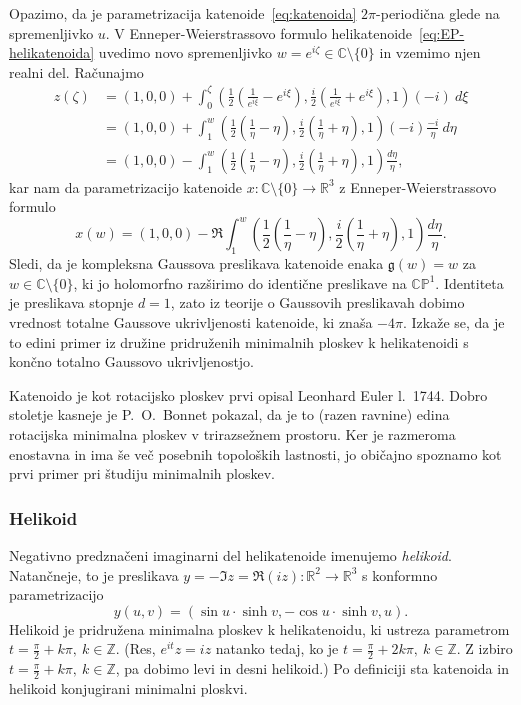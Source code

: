 \documentclass[12pt,a4paper,twoside]{article}
\theoremstyle{definition} %
\theoremstyle{plain} %
\numberwithin{equation}{section}  %
\begin{document}
Opazimo, da je parametrizacija katenoide~\eqref{eq:katenoida} $2 \pi$-periodična glede na spremenljivko $u$. V Enneper-Weierstrassovo formulo helikatenoide~\eqref{eq:EP-helikatenoida} uvedimo novo spremenljivko $w = e^{i \zeta} \in \mathbb{C} \setminus \{0\}$ in vzemimo njen realni del. Računajmo
\begin{align*}
z(\zeta) &= (1,0,0) + \int_{0}^{\zeta} \left( \frac{1}{2} \left(\frac{1}{e^{i\xi}} - e^{i\xi} \right), \frac{i}{2} \left(\frac{1}{e^{i\xi}} + e^{i\xi} \right), 1 \right) (-i) \ d\xi \\
	&= (1,0,0) + \int_{1}^{w} \left( \frac{1}{2} \left(\frac{1}{\eta} - \eta \right), \frac{i}{2} \left(\frac{1}{\eta} + \eta \right), 1 \right) (-i) \frac{-i}{\eta} \ d\eta \\
	&= (1,0,0) - \int_{1}^{w} \left( \frac{1}{2} \left(\frac{1}{\eta} - \eta \right), \frac{i}{2} \left(\frac{1}{\eta} + \eta \right), 1 \right) \frac{d\eta}{\eta},
\end{align*}
kar nam da parametrizacijo katenoide $x \colon \mathbb{C} \setminus \{0\} \to \mathbb{R}^3$ z Enneper-Weierstrassovo formulo
\begin{equation}
x(w) = (1,0,0) - \Re \int_{1}^{w} \left( \frac{1}{2} \left(\frac{1}{\eta} - \eta \right), \frac{i}{2} \left(\frac{1}{\eta} + \eta \right), 1 \right) \frac{d\eta}{\eta}.
\end{equation}
Sledi, da je kompleksna Gaussova preslikava katenoide enaka $\mathfrak{g}(w) = w$ za $w \in \mathbb{C} \setminus \{0\}$, ki jo holomorfno razširimo do identične preslikave na $\mathbb{CP}^{1}$. Identiteta je preslikava stopnje $d=1$, zato iz teorije o Gaussovih preslikavah dobimo vrednost totalne Gaussove ukrivljenosti katenoide, ki znaša $-4 \pi$. Izkaže se, da je to edini primer iz družine pridruženih minimalnih ploskev k helikatenoidi s končno totalno Gaussovo ukrivljenostjo.

Katenoido je kot rotacijsko ploskev prvi opisal Leonhard Euler l.~1744. Dobro stoletje kasneje je P.~O.~Bonnet pokazal, da je to (razen ravnine) edina rotacijska minimalna ploskev v trirazsežnem prostoru. Ker je razmeroma enostavna in ima še več posebnih topoloških lastnosti, jo običajno spoznamo kot prvi primer pri študiju minimalnih ploskev.

\subsubsection{Helikoid}
%
Negativno predznačeni imaginarni del helikatenoide imenujemo \emph{helikoid}. Natančneje, to je preslikava $y = -\Im z = \Re (iz) \colon \mathbb{R}^2 \to \mathbb{R}^3$ s konformno parametrizacijo
\begin{equation} \label{eq:helikoid}
y(u,v) = (\sin u \cdot \sinh v, -\cos u \cdot \sinh v, u).
\end{equation}
Helikoid je pridružena minimalna ploskev k helikatenoidu, ki ustreza parametrom $t = \frac{\pi}{2} + k \pi, \ k \in \mathbb{Z}$. (Res, $e^{it}z = iz$ natanko tedaj, ko je $t = \frac{\pi}{2} + 2k \pi, \ k \in \mathbb{Z}$. Z izbiro $t = \frac{\pi}{2} + k \pi, \ k \in \mathbb{Z}$, pa dobimo levi in desni helikoid.) Po definiciji sta katenoida in helikoid konjugirani minimalni ploskvi.
\end{document}
